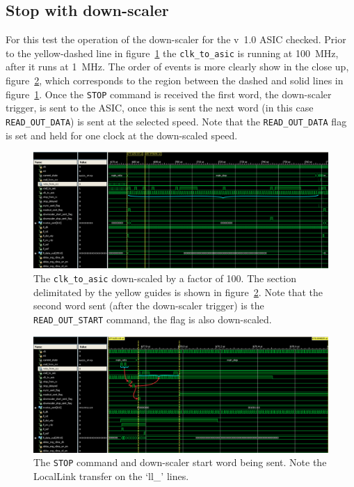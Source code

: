 \subsection{Stop with down-scaler} %
\label{sec:stop_downscaler}
For this test the operation of the down-scaler for the v~1.0 ASIC checked. Prior to the yellow-dashed line in figure~\ref{fig:isim_stop-downscaler} the \texttt{clk\_to\_asic} is running at 100~MHz, after it runs at 1~MHz. The order of events is more clearly show in the close up, figure~\ref{fig:isim_stop-downscaler-zoom}, which corresponds to the region between the dashed and solid lines in figure~\ref{fig:isim_stop-downscaler}. Once the \texttt{STOP} command is received the first word, the down-scaler trigger, is sent to the ASIC, once this is sent the next word (in this case \texttt{READ\_OUT\_DATA}) is sent at the selected speed. Note that the \texttt{READ\_OUT\_DATA} flag is set and held for one clock at the down-scaled speed.

\begin{figure}[htbp]
  \centering
  \includegraphics[width=\textwidth]{images/isim/edited/stop-downscaler.png}
  \caption{The \texttt{clk\_to\_asic} down-scaled by a factor of 100. The section delimitated by the yellow guides is shown in figure~\ref{fig:isim_stop-downscaler-zoom}. Note that the second word sent (after the down-scaler trigger) is the \texttt{READ\_OUT\_START} command, the flag is also down-scaled.}
  \label{fig:isim_stop-downscaler}
\end{figure}
    
\begin{figure}[htbp]
  \centering  
  \includegraphics[width=\textwidth]{images/isim/edited/stop-downscaler-zoom.png}
  \caption{The \texttt{STOP} command and down-scaler start word being sent. Note the LocalLink transfer on the `ll\_' lines.}
  \label{fig:isim_stop-downscaler-zoom}
\end{figure}
